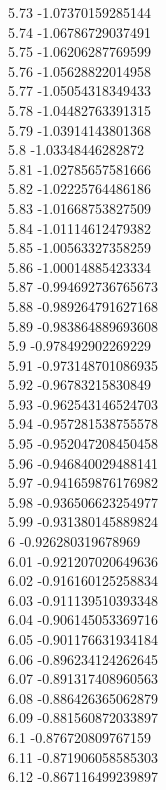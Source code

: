 {5.73	-1.07370159285144\\
5.74	-1.06786729037491\\
5.75	-1.06206287769599\\
5.76	-1.05628822014958\\
5.77	-1.05054318349433\\
5.78	-1.04482763391315\\
5.79	-1.03914143801368\\
5.8	-1.03348446282872\\
5.81	-1.02785657581666\\
5.82	-1.02225764486186\\
5.83	-1.01668753827509\\
5.84	-1.01114612479382\\
5.85	-1.00563327358259\\
5.86	-1.00014885423334\\
5.87	-0.994692736765673\\
5.88	-0.989264791627168\\
5.89	-0.983864889693608\\
5.9	-0.978492902269229\\
5.91	-0.973148701086935\\
5.92	-0.96783215830849\\
5.93	-0.962543146524703\\
5.94	-0.957281538755578\\
5.95	-0.952047208450458\\
5.96	-0.946840029488141\\
5.97	-0.941659876176982\\
5.98	-0.936506623254977\\
5.99	-0.931380145889824\\
6	-0.926280319678969\\
6.01	-0.921207020649636\\
6.02	-0.916160125258834\\
6.03	-0.911139510393348\\
6.04	-0.906145053369716\\
6.05	-0.901176631934184\\
6.06	-0.896234124262645\\
6.07	-0.891317408960563\\
6.08	-0.886426365062879\\
6.09	-0.881560872033897\\
6.1	-0.876720809767159\\
6.11	-0.871906058585303\\
6.12	-0.867116499239897\\
}
